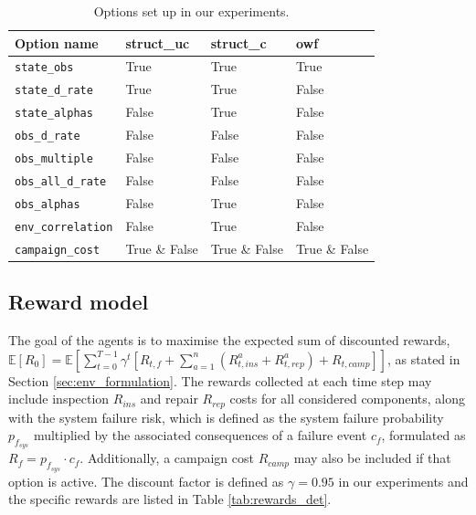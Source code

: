 \begin{table}
\centering
\caption{Options set up in our experiments.}
\label{tab:ouroptionvlaues}
\begin{tabular}{llll}
\toprule
Option name & struct\_uc & struct\_c & owf \\
\midrule
\texttt{state\_obs} & True & True & True \\
\texttt{state\_d\_rate} & True & True & False \\
\texttt{state\_alphas} & False & True & False \\
\texttt{obs\_d\_rate} & False & False & False \\
\texttt{obs\_multiple} & False & False & False \\
\texttt{obs\_all\_d\_rate} & False & False & False \\
\texttt{obs\_alphas} & False & True & False \\
\texttt{env\_correlation} & False & True & False \\
\texttt{campaign\_cost} & True \& False & True \& False & True \& False \\
\bottomrule
\end{tabular}
\end{table}

\subsection{Reward model}
The goal of the agents is to maximise the expected sum of discounted rewards, $\mathbb{E}[R_{0}] = \mathbb{E} \left[ \sum_{t=0}^{T-1} \gamma^t \left[ R_{t,f}+ \sum_{a=1}^n \left({R_{t,ins}^a} + {R_{t,rep}^a}\right)+R_{t,camp} \right] \right]$, as stated in Section \ref{sec:env_formulation}.
The rewards collected at each time step may include inspection $R_{ins}$ and repair $R_{rep}$ costs for all considered components, along with the system failure risk, which is defined as the system failure probability $p_{f_{sys}}$ multiplied by the associated consequences of a failure event $c_f$, formulated as $R_f = p_{f_{sys}} \cdot c_f$. Additionally, a campaign cost $R_{camp}$ may also be included if that option is active.
The discount factor is defined as $\gamma=0.95$ in our experiments and the specific rewards are listed in Table \ref{tab:rewards_det}.


